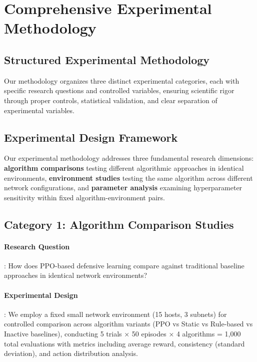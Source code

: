 \documentclass[12pt,oneside]{article}
\begin{document}
\clearpage
\section{Comprehensive Experimental Methodology}

\subsection{Structured Experimental Methodology}

Our methodology organizes three distinct experimental categories, each with specific research questions and controlled variables, ensuring scientific rigor through proper controls, statistical validation, and clear separation of experimental variables.

\subsection{Experimental Design Framework}

Our experimental methodology addresses three fundamental research dimensions: \textbf{algorithm comparisons} testing different algorithmic approaches in identical environments, \textbf{environment studies} testing the same algorithm across different network configurations, and \textbf{parameter analysis} examining hyperparameter sensitivity within fixed algorithm-environment pairs.

\subsection{Category 1: Algorithm Comparison Studies}

\paragraph{Research Question}: How does PPO-based defensive learning compare against traditional baseline approaches in identical network environments?

\paragraph{Experimental Design}: We employ a fixed small network environment (15 hosts, 3 subnets) for controlled comparison across algorithm variants (PPO vs Static vs Rule-based vs Inactive baselines), conducting 5 trials × 50 episodes × 4 algorithms = 1,000 total evaluations with metrics including average reward, consistency (standard deviation), and action distribution analysis.
\end{document}
